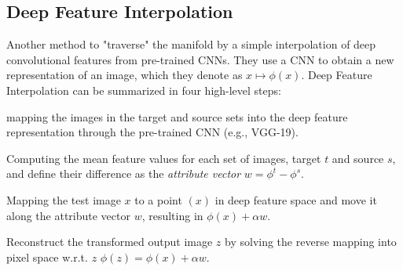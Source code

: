 \documentclass[letterpaper,12pt]{article}
\begin{document}
\subsection{Deep Feature Interpolation} \cite{deep_feature_interpolation} Another method to "traverse" the manifold by a simple interpolation of deep convolutional features from pre-trained CNNs. They use a CNN  to obtain a new representation
of an image, which they denote as $x\mapsto\phi(x)$. Deep Feature Interpolation can be summarized in four
high-level steps: \begin{enumerate*}[label={\roman*)},font={\color{red!50!black}\bfseries}]

\item mapping the images in the target and source sets into the deep feature representation through the pre-trained CNN  (e.g., VGG-19).
\item Computing the mean feature values for each set of
images, target $t$ and source $s$, and define their difference as the
\textit{attribute vector} $w=\phi^t - \phi^s$.

\item Mapping the test image $x$ to a point $(x)$ in deep feature space and move it along the attribute vector $w$, resulting
in $\phi(x) + \alpha w$.

\item Reconstruct the transformed output image $z$ by
solving the reverse mapping into pixel space w.r.t. $z$
$\phi(z) = \phi(x) + \alpha w$.
\end{enumerate*}
\end{document}
